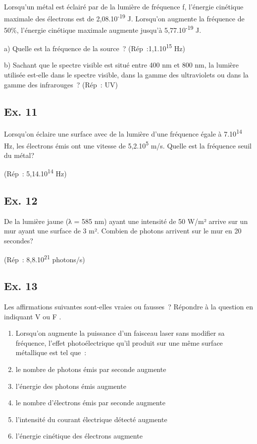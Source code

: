 {{{Lorsqu'un métal est éclairé par de la lumière de fréquence f, l'énergie
cinétique maximale des électrons est de 2,08.10\textsuperscript{-19} J.
Lorsqu'on augmente la fréquence de 50\%, l'énergie cinétique maximale
augmente jusqu'à 5,77.10\textsuperscript{-19} J.

a) Quelle est la fréquence de la source~?
(Rép~:1,1.10\textsuperscript{15} Hz)

b) Sachant que le spectre visible est situé entre 400 nm et 800 nm, la
lumière utilisée est-elle dans le spectre visible, dans la gamme des
ultraviolets ou dans la gamme des infrarouges~? (Rép~: UV)

\subsection{Ex. 11}

Lorsqu'on éclaire une surface avec de la lumière d'une fréquence égale à
7.10\textsuperscript{14 }Hz, les électrons émis ont une vitesse de
5,2.10\textsuperscript{5} m/s. Quelle est la fréquence seuil du métal?

(Rép~: 5,14.10\textsuperscript{14} Hz)

\subsection{Ex. 12}

De la lumière jaune (λ = 585 nm) ayant une intensité de 50 W/m² arrive
sur un mur ayant une surface de 3 m². Combien de photons arrivent sur le
mur en 20 secondes?

(Rép~: 8,8.10\textsuperscript{21} photons/s)

\subsection{Ex. 13}

Les affirmations suivantes sont-elles vraies ou fausses~? Répondre à la
question en indiquant V ou F .

\begin{enumerate}
\item  Lorsqu'on augmente la puissance d'un faisceau laser sans modifier sa
  fréquence, l'effet photoélectrique qu'il produit sur une même surface
  métallique est tel que~:
\item le nombre de photons émis par seconde augmente
\item  l'énergie des photons émis augmente
\item  le nombre d'électrons émis par seconde augmente
\item  l'intensité du courant électrique détecté augmente
\item  l'énergie cinétique des électrons augmente
\end{enumerate}

}}}

